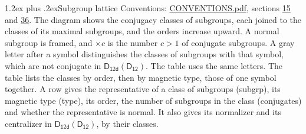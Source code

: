 \documentclass[10pt,a4paper]{article}
\makeatletter
\renewcommand\section{\@startsection{section}{1}{\z@}{-3ex plus -1ex minus -.2ex}%
  {1.2ex plus .2ex}{\normalfont\large\sffamily\bfseries\color{parttitle}}}
\numberwithin{equation}{section}
\newcommand{\grp}[1]{\mathsf{#1}}
\makeatother
\begin{document}
\section{Subgroup lattice}\label{s:subgroups}
Conventions: \href{../../CONVENTIONS.pdf}{CONVENTIONS.pdf}, sections \href{../../../rotation/CONVENTIONS.pdf\#conv.15}{15} and \href{../../CONVENTIONS.pdf\#conv.36}{36}.
The diagram shows the conjugacy classes of subgroups, each joined to the classes of its maximal subgroups, and the orders increase upward. \label{n:index.conjugates.c}\label{n:mark.conjugates}A normal subgroup is framed, and ${\times}c$ is the number $c > 1$ of conjugate subgroups. \label{n:mark.letter}A gray letter after a symbol distinguishes the classes of subgroups with that symbol, which are not conjugate in $\grp{D_{12d}}(\grp{D_{12}})$. The table uses the same letters. The table lists the classes by order, then by magnetic type, those of one symbol together. \label{n:head.subgroup}\label{n:head.magnetic.type}\label{n:head.order}\label{n:head.conjugates}\label{n:head.normal}A row gives the representative of a class of subgroups (subgrp), its magnetic type (type), its order, the number of subgroups in the class (conjugates) and whether the representative is normal. \label{n:head.normalizer}\label{n:head.centralizer}It also gives its normalizer and its centralizer in $\grp{D_{12d}}(\grp{D_{12}})$, by their classes. 
\end{document}

